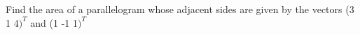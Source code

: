 Find the area of a parallelogram whose adjacent sides are given by the vectors 
(3 1 4$)^T$ and (1 -1 1$)^T$








